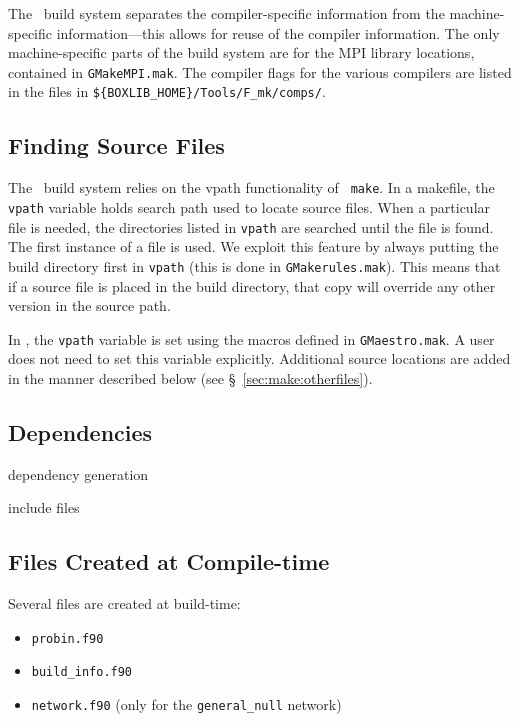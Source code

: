 The \boxlib\ build system separates the compiler-specific information
from the machine-specific information---this allows for reuse of the
compiler information.  The only machine-specific parts of the build system
are for the MPI library locations, contained in {\tt GMakeMPI.mak}.
The compiler flags for the various compilers are listed in the
files in {\tt \$\{BOXLIB\_HOME\}/Tools/F\_mk/comps/}.

\subsection{Finding Source Files}

The \boxlib\ build system relies on the vpath functionality of {\tt
make}.  In a makefile, the {\tt vpath} variable holds search path used
to locate source files.  When a particular file is needed, the
directories listed in {\tt vpath} are searched until the file is
found.  The first instance of a file is used.  We exploit this feature
by always putting the build directory first in {\tt vpath} (this is
done in {\tt GMakerules.mak}).  This means that if a source file is
placed in the build directory, that copy will override any other
version in the source path.

In \maestro, the {\tt vpath} variable is set using the macros defined
in {\tt GMaestro.mak}.  A user does not need to set this variable
explicitly.  Additional source locations are added in the manner
described below (see \S~\ref{sec:make:otherfiles}).

\subsection{Dependencies}

dependency generation

include files

\subsection{Files Created at Compile-time}

Several files are created at build-time:
\begin{itemize}
\item {\tt probin.f90}

\item {\tt build\_info.f90}

\item {\tt network.f90} (only for the {\tt general\_null} network)
\end{itemize}



